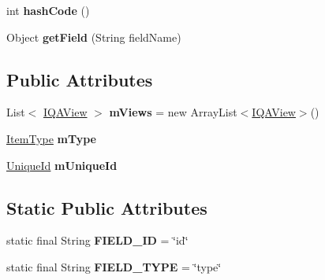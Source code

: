 \begin{DoxyCompactItemize}
\item 
\hypertarget{classcom_1_1ualberta_1_1team17_1_1_q_a_model_a4c6b22066877f83e7d0e13a56aacb5ec}{int {\bfseries hash\+Code} ()}\label{classcom_1_1ualberta_1_1team17_1_1_q_a_model_a4c6b22066877f83e7d0e13a56aacb5ec}

\item 
\hypertarget{classcom_1_1ualberta_1_1team17_1_1_q_a_model_a7de9dedbf041b7eb3e25460f9d575445}{Object {\bfseries get\+Field} (String field\+Name)}\label{classcom_1_1ualberta_1_1team17_1_1_q_a_model_a7de9dedbf041b7eb3e25460f9d575445}

\end{DoxyCompactItemize}
\subsection*{Public Attributes}
\begin{DoxyCompactItemize}
\item 
\hypertarget{classcom_1_1ualberta_1_1team17_1_1_q_a_model_a54c5007c235607f66cabe6d266f143fe}{List$<$ \hyperlink{interfacecom_1_1ualberta_1_1team17_1_1view_1_1_i_q_a_view}{I\+Q\+A\+View} $>$ {\bfseries m\+Views} = new Array\+List$<$\hyperlink{interfacecom_1_1ualberta_1_1team17_1_1view_1_1_i_q_a_view}{I\+Q\+A\+View}$>$()}\label{classcom_1_1ualberta_1_1team17_1_1_q_a_model_a54c5007c235607f66cabe6d266f143fe}

\item 
\hypertarget{classcom_1_1ualberta_1_1team17_1_1_q_a_model_a5f436f1aad0608ae146cb2b72190fbcf}{\hyperlink{enumcom_1_1ualberta_1_1team17_1_1_item_type}{Item\+Type} {\bfseries m\+Type}}\label{classcom_1_1ualberta_1_1team17_1_1_q_a_model_a5f436f1aad0608ae146cb2b72190fbcf}

\item 
\hypertarget{classcom_1_1ualberta_1_1team17_1_1_q_a_model_a8cfe0537d5f08d90364a5bd1850f79b4}{\hyperlink{classcom_1_1ualberta_1_1team17_1_1_unique_id}{Unique\+Id} {\bfseries m\+Unique\+Id}}\label{classcom_1_1ualberta_1_1team17_1_1_q_a_model_a8cfe0537d5f08d90364a5bd1850f79b4}

\end{DoxyCompactItemize}
\subsection*{Static Public Attributes}
\begin{DoxyCompactItemize}
\item 
\hypertarget{classcom_1_1ualberta_1_1team17_1_1_q_a_model_aa701e881bde0e9a760fdd8c7cce09f2f}{static final String {\bfseries F\+I\+E\+L\+D\+\_\+\+I\+D} = \char`\"{}id\char`\"{}}\label{classcom_1_1ualberta_1_1team17_1_1_q_a_model_aa701e881bde0e9a760fdd8c7cce09f2f}

\item 
\hypertarget{classcom_1_1ualberta_1_1team17_1_1_q_a_model_ad43e6eab940357f85671baa7ca25b22a}{static final String {\bfseries F\+I\+E\+L\+D\+\_\+\+T\+Y\+P\+E} = \char`\"{}type\char`\"{}}\label{classcom_1_1ualberta_1_1team17_1_1_q_a_model_ad43e6eab940357f85671baa7ca25b22a}

\end{DoxyCompactItemize}


